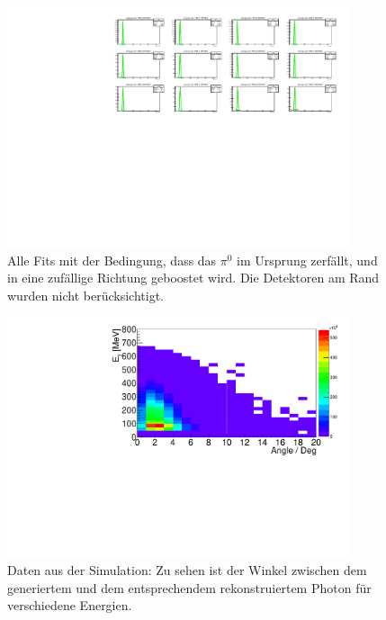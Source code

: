 \documentclass[a4paper,11pt,oneside,final,german,openbib,pdftex]{scrbook}
\begin{document}
{\begin{appendix}
\begin{figure}[h!]
	\begin{center}
		\includegraphics[width=100mm]{NewCalib/UrsprungIsotrop/20171904SimIsotropUrsprung30DegreeCutAllFits}
		\caption[Simulation: 2D-Hist Isotroper Boost im Ursprung ohne Detektoren am Rand alle Fits]{Alle Fits mit der Bedingung, dass das $\pi^0$ im Ursprung zerf\"allt, und in eine zuf\"allige Richtung geboostet wird. Die Detektoren am Rand wurden nicht ber\"ucksichtigt.}
	\end{center}
	
\end{figure}

\begin{figure}[h!]
	\begin{center}
		\includegraphics[width=100mm]{AngleRegGen/20171804TrueCandsAngleDeviation}
		\caption[Simulation: Winkel zwischen generiertem und rekonstruiertem Photon]{Daten aus der Simulation: Zu sehen ist der Winkel zwischen dem generiertem und dem entsprechendem rekonstruiertem Photon f\"ur verschiedene Energien.}
		\label{fig:Angle-Rec-Gen-Hist}
	\end{center}
\end{figure}






\end{appendix}}
\end{document}
